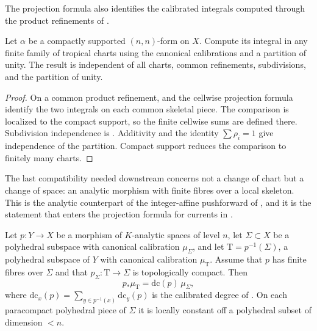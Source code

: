 The projection formula also identifies the calibrated integrals computed
through the product refinements of .

\begin{corollary}\label{cor:analytic-integration-independent}
Let $\alpha$ be a compactly supported $(n,n)$-form on $X$. Compute its
integral in any finite family of tropical charts using the canonical
calibrations and a partition of unity. The result is independent of all
charts, common refinements, subdivisions, and the partition of unity.
\end{corollary}
\begin{proof}
On a common product refinement,
 and the cellwise projection
formula identify the two integrals on each common skeletal piece. The comparison is localized
to the compact support, so the finite cellwise sums are defined there.
Subdivision independence is
. Additivity and the
identity $\sum\rho_i=1$ give independence of the partition. Compact support
reduces the comparison to finitely many charts.
\end{proof}

The last compatibility needed downstream concerns not a change of chart but
a change of space: an analytic morphism with finite fibres over a local
skeleton. This is the analytic counterpart of the integer-affine pushforward
of , and it is the statement that
enters the projection formula for currents in .

\begin{theorem}
\label{thm:trop-finite-pushforward}
Let $p:Y\to X$ be a morphism of $K$-analytic spaces of level $n$, let
$\Sigma\subset X$ be a polyhedral subspace with canonical calibration
$\mu_\Sigma$, and let $\mathrm T=p^{-1}(\Sigma)$, a polyhedral subspace of
$Y$ with canonical calibration $\mu_{\mathrm T}$. Assume that $p$ has finite
fibres over $\Sigma$ and that $p_\Sigma:\mathrm T\to\Sigma$ is
topologically compact. Then
\begin{equation}
\label{eq:trop-finite-pushforward}
 p_*\mu_{\mathrm T}=\mathrm{dc}(p)\,\mu_\Sigma,
\end{equation}
where $\mathrm{dc}_x(p)=\sum_{y\in p^{-1}(x)}\mathrm{dc}_y(p)$ is the
calibrated degree of . On each paracompact polyhedral
piece of $\Sigma$ it is locally constant off a polyhedral subset of
dimension $<n$.
\end{theorem}

